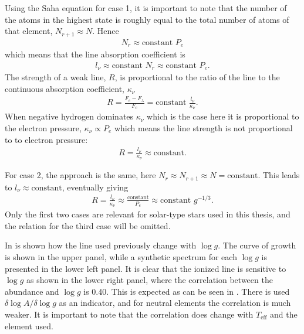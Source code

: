 Using the Saha equation for case 1, it is important to note that the number of the atoms in the
highest state is roughly equal to the total number of atoms of that element, $N_{r+1}\approx N$.
Hence
\begin{align}
  N_r \approx \mathrm{constant}\,\, P_e
\end{align}
which means that the line absorption coefficient is
\begin{align}
  l_\nu \approx \mathrm{constant}\,\, N_r \approx \mathrm{constant}\,\, P_e.
\end{align}
The strength of a weak line, $R$, is proportional to the ratio of the line to the continuous
absorption coefficient, $\kappa_\nu$
\begin{align}
  R = \frac{F_c-F_\lambda}{F_c} = \mathrm{constant}\,\, \frac{l_\nu}{\kappa_\nu}.
\end{align}
When negative hydrogen dominates $\kappa_\nu$ which is the case here it is proportional to the
electron pressure, $\kappa_\nu\propto P_e$ which means the line strength is not proportional to to
electron pressure:
\begin{align}
  R = \frac{l_\nu}{\kappa_\nu} \approx \mathrm{constant}.
\end{align}

For case 2, the approach is the same, here $N_r\approx N_{r+1}\approx N= \mathrm{constant}$. This
leads to $l_\nu\approx\mathrm{constant}$, eventually giving
\begin{align}
  R=\frac{l_\nu}{\kappa_\nu} \approx \frac{\mathrm{constant}}{P_e} \approx \mathrm{constant}\,\, g^{-1/3}.
\end{align}
Only the first two cases are relevant for solar-type stars used in this thesis, and the relation for
the third case will be omitted.

In  is shown how the  line used previously change with $\log g$. The
curve of growth is shown in the upper panel, while a synthetic spectrum for each $\log g$ is
presented in the lower left panel. It is clear that the ionized line is sensitive to $\log g$ as
shown in the lower right panel, where the correlation between the abundance and $\log g$ is 0.40.
This is expected as can be seen in \citet[][Table 16.1]{Gray2006}. There is used $\delta\log
A/\delta\log g$ as an indicator, and for neutral elements the correlation is much weaker. It is
important to note that the correlation does change with $T_\mathrm{eff}$ and the element used.

